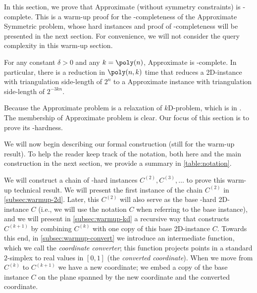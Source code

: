 
In this section, we prove that \outofk Approximate \Sperner (without symmetry constraints) is \PPAD-complete. 
This is a warm-up proof for the \PPAD-completeness of the \outofk Approximate Symmetric \Sperner problem, whose hard instances and proof of \PPAD-completeness will be presented in the next section.
For convenience, we will not consider the query complexity in this warm-up section. 

\begin{theorem}
    For any constant $\delta>0$ and any $k=\poly(n)$, \outofk Approximate \Sperner is \PPAD-complete.
    In particular, there is a reduction in $\poly(n,k)$ time that reduces a 2{\rm D}-\Sperner instance with triangulation side-length of $2^n$ to a \outofk Approximate \Sperner instance with triangulation side-length of $2^{-3kn}$.
\end{theorem}

Because the \outofk Approximate \Sperner problem is a relaxation of $k${\rm D}-\Sperner problem, which is in \PPAD. 
The {\PPAD\xspace} membership of \outofk Approximate \Sperner problem is clear. 
Our focus of this section is to prove its \PPAD-hardness.

We will now begin describing our formal construction (still for the warm-up result). To help the reader keep track of the notation, both here and the main construction in the next section, we provide a summary in \cref{table:notation}.


We will construct a chain of \PPAD-hard instances $C^{(2)}, C^{(3)}, \dots$ to prove this warm-up technical result. 
We will present the first instance of the chain $C^{(2)}$ in \cref{subsec:warmup-2d}.
Later, this $C^{(2)}$ will also serve as the base \PPAD-hard 2{\rm D}-\Sperner instance $C$ (i.e., we will use the notation $C$ when referring to the base instance), and we will present in \cref{subsec:warmup-kd} a recursive way that constructs $C^{(k+1)}$ by combining $C^{(k)}$ with one copy of this base 2{\rm D}-\Sperner instance $C$. 
Towards this end, in \cref{subsec:warmup-convert} we introduce an intermediate function, which we call the {\em coordinate converter}; this function projects points in a standard $2$-simplex to real values in $[0,1]$ (the {\em converted coordinate}). When we move from $C^{(k)}$ to $C^{(k+1)}$ we have a new coordinate; we embed a copy of the base instance $C$ on the plane spanned by the new coordinate and the converted coordinate. 

